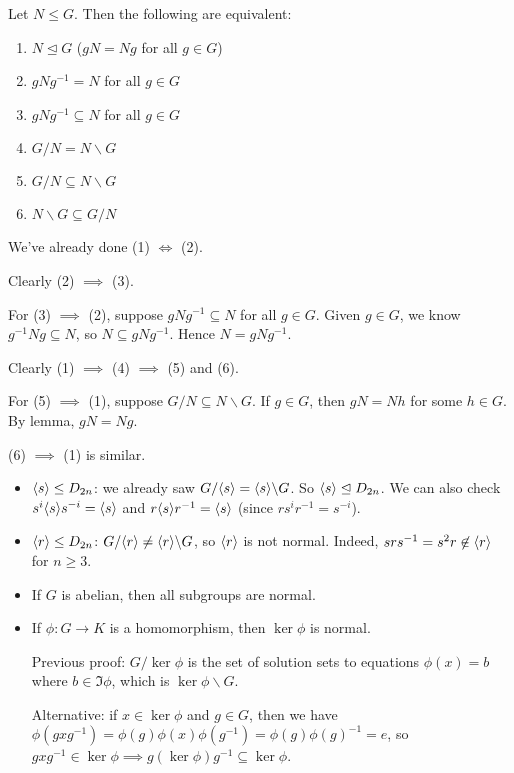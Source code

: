 \documentclass[12pt,letterpaper]{report}
\begin{document}
\begin{prop}{}{}
  Let $N \leq G$.
  Then the following are equivalent:
  \begin{multicols}{2}
    \begin{enumerate}
      \item $N \trianglelefteq G$ ($gN = Ng$ for all $g \in G$)
      \item $gNg^{-1} = N$ for all $g \in G$
      \item $gNg^{-1} \subseteq N$ for all $g \in G$
      \item $G/N = N \backslash G$
      \item $G/N \subseteq N \backslash G$
      \item $N \backslash G \subseteq G/N$
    \end{enumerate}
  \end{multicols}
\end{prop}

\begin{thmproof}
  We've already done (1) $\iff$ (2).

  Clearly (2) $\implies$ (3).

  For (3) $\implies$ (2), suppose $gNg^{-1} \subseteq N$ for all $g \in G$.
  Given $g \in G$, we know $g^{-1}Ng \subseteq N$, so $N \subseteq gNg^{-1}$.
  Hence $N = gNg^{-1}$.

  Clearly (1) $\implies$ (4) $\implies$ (5) and (6).

  For (5) $\implies$ (1), suppose $G/N \subseteq N \backslash G$.
  If $g \in G$, then $gN = Nh$ for some $h \in G$.
  By lemma, $gN = Ng$.

  (6) $\implies$ (1) is similar.
\end{thmproof}

\begin{ex}
  \begin{itemize}
    \item
    $\langle s\rangle \leq D_{2n}$: we already saw $G/\langle s\rangle = \langle s\rangle \backslash G$.
    So $\langle s\rangle \trianglelefteq D_{2n}$.
    We can also check $s^i\langle s\rangle s^{-i} = \langle s\rangle$ and $r\langle s\rangle r^{-1} = \langle s\rangle$ (since
    $rs^ir^{-1} = s^{-i}$).
    \item
    $\langle r\rangle \leq D_{2n}$: $G/\langle r\rangle \neq \langle r\rangle \backslash G$, so $\langle r\rangle$ is not normal.
    Indeed, $srs^{-1} = s^2r \not\in \langle r\rangle$ for $n \geq 3$.
    \item
    If $G$ is abelian, then all subgroups are normal.
    \item
    If $\phi \colon G \to K$ is a homomorphism, then $\ker\phi$ is normal.

    Previous proof: $G/\ker\phi$ is the set of solution sets to equations $\phi(x) = b$ where
    $b \in \Im\phi$, which is $\ker\phi \backslash G$.

    Alternative: if $x \in \ker\phi$ and $g \in G$, then we have
    $\phi(gxg^{-1}) = \phi(g)\phi(x)\phi(g^{-1}) = \phi(g)\phi(g)^{-1} = e$, so
    $gxg^{-1} \in \ker\phi \implies g(\ker\phi)g^{-1} \subseteq \ker\phi$.
  \end{itemize}
\end{ex}
\end{document}
